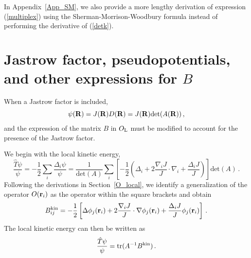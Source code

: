 \documentclass[aip,jcp,reprint,floatfix,onecolumn]{revtex4-1}
\def\det{\text{det}}
\def\tr{\text{tr}}
\begin{document}
In Appendix~\ref{App_SM}, we also provide a more lengthy derivation of expression (\ref{multiplex}) using the Sherman-Morrison-Woodbury
formula instead of performing the derivative of (\ref{detk}).


\section{Jastrow factor, pseudopotentials, and other expressions for $B$}
\label{jaspseB}

When a Jastrow factor is included,
\begin{equation}
\psi({\bf R}) = J ({\bf R}) D ({\bf R}) = J ({\bf R}) \det (A({\bf R}))\,,
\end{equation}
and the expression of the matrix $B$ in $O_{\rm L}$ must be modified to account for the presence of the Jastrow factor.

We begin with the local kinetic energy,
\begin{equation}
\frac{\hat{T} \psi} {\psi}= -\frac{1}{2}\sum_i \frac{\Delta_i \psi}{\psi} =
\frac{1}{\det(A)}\sum_i\left[-\frac{1}{2}\left(\Delta_i  + 2\frac{\nabla_i J}{J}\cdot {\nabla_i } + \frac{\Delta_i J}{J} \right)\right]\det(A)\,.
\label{Jkin}
\end{equation}
Following the derivations in Section~\ref{O_local}, we identify a generalization of the operator $O({\bf r}_i)$ as the operator within the square brackets and obtain
\begin{equation}
B^{\rm kin}_{ij}= -\frac{1}{2} \left[
 \Delta \phi_j({\bf r}_i) + 2\frac{\nabla_i J}{J} \cdot \nabla \phi_j({\bf r}_i) + \frac{\Delta_i J}{J}  \phi_j({\bf r}_i) \right]\,.
\label{Bdef}
\end{equation}
The local kinetic energy can then be written as
\begin{equation}
\frac{\hat{T}    \psi}{\psi} =  \tr  (A^{-1} B^{\rm kin})\,.
\end{equation}
\end{document}

